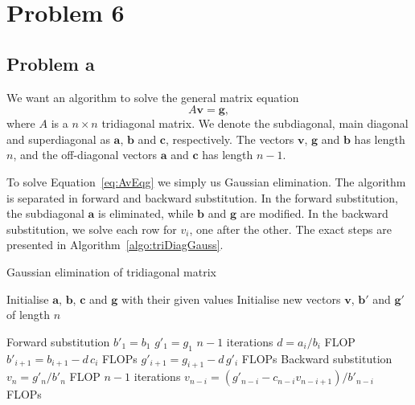 \documentclass[english,notitlepage,aps,pra,10pt]{revtex4-2}
\newcommand{\bv}[1]{\mathbf{#1}}
\begin{document}
\section*{Problem 6}
\subsection*{Problem a}
We want an algorithm to solve the general matrix equation 
\begin{equation}
    A \bv{v} = \bv{g},
    \label{eq:AvEqg}
\end{equation}
where $A$ is a $n \times n$ tridiagonal matrix. We denote the subdiagonal, main diagonal and superdiagonal as $\bv{a}$, $\bv{b}$ and $\bv{c}$, respectively. The vectors $\bv{v}$, $\bv{g}$ and $\bv{b}$ has length $n$, and the off-diagonal vectors $\bv{a}$ and $\bv{c}$ has length $n-1$. 

To solve Equation~\ref{eq:AvEqg} we simply us Gaussian elimination. The algorithm is separated in forward and backward substitution. In the forward substitution, the subdiagonal $\bv{a}$ is eliminated, while $\bv{b}$ and $\bv{g}$ are modified. In the backward substitution, we solve each row for $v_i$, one after the other. The exact steps are presented in Algorithm~\ref{algo:triDiagGauss}.

\begin{algorithm}[H]
    \caption{Gaussian elimination of tridiagonal matrix}\label{algo:triDiagGauss}
    \begin{algorithmic}
        \State Initialise $\bv{a}$, $\bv{b}$, $\bv{c}$ and $\bv{g}$ with their given values
        \State Initialise new vectors $\bv{v}$, $\bv{b}'$ and $\bv{g}'$ of length $n$ 

        \Comment Forward substitution
        \State $b'_1 = b_1$
        \State $g'_1 = g_1$
                        \Comment $n-1$ iterations
            \State $d = a_i/b_i$                     FLOP
            \State $b'_{i+1} = b_{i+1} - d\, c_i$    FLOPs 
            \State $g'_{i+1} = g_{i+1} - d\, g'_i$   FLOPs 
        \EndFor
        \Comment Backward substitution
        \State $v_n = g'_n/b'_n$                     FLOP 
                        \Comment $n-1$ iterations
            \State $v_{n-i} = (g'_{n-i} - c_{n-i} v_{n-i+1})/b'_{n-i}$   FLOPs
        \EndFor
    \end{algorithmic}
\end{algorithm}
\end{document}
